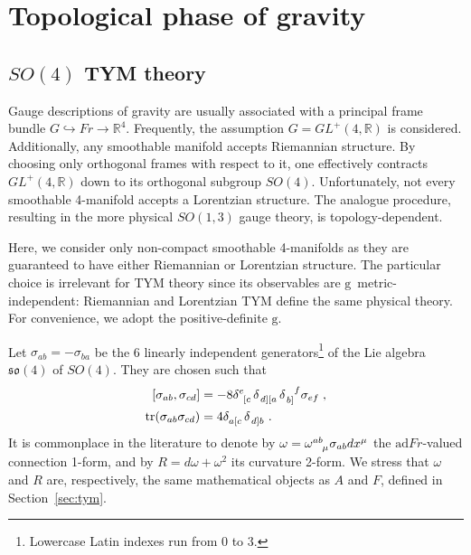\documentclass[../main.tex]{subfiles}
\begin{document}
\section{Topological phase of gravity}%
\label{sec:top_grav}

\subsection{\texorpdfstring{$SO(4)$}{SO(4)} TYM theory}%
\label{ssec:so4tym;sec:top_grav}

Gauge descriptions of gravity are usually associated with a principal frame bundle $G \hookrightarrow Fr \rightarrow \mathbb{R}^4 $. Frequently, the assumption $G = GL^{+}\left( 4, \mathbb{R} \right)$ is considered. Additionally, any smoothable manifold accepts Riemannian structure. By choosing only orthogonal frames with respect to it, one effectively contracts $GL^{+} \left( 4,\mathbb{R} \right)$ down to its orthogonal subgroup $SO \left( 4 \right)$. Unfortunately, not every smoothable 4-manifold accepts a Lorentzian structure. The analogue procedure, resulting in the more physical $SO \left( 1,3 \right)$ gauge theory, is topology-dependent.

Here, we consider only non-compact smoothable 4-manifolds as they are guaranteed to have either Riemannian or Lorentzian structure. The particular choice is irrelevant for TYM theory since its observables are $ \mathrm{g} $~metric-independent: Riemannian and Lorentzian TYM define the same physical theory. For convenience, we adopt the positive-definite $ \mathrm{g} $.

Let $\sigma_{ab}=-\sigma_{ba}$ be the 6 linearly independent generators\footnote{Lowercase Latin indexes run from 0 to 3.} of the Lie algebra $\mathfrak{so}\left( 4 \right)$ of $SO(4)$. They are chosen such that
\begin{subequations}%
  \label{eq:so4algebra}
  \begin{align}
    \left[ \sigma_{ab}, \sigma_{cd} \right] & =-8\tensor{\delta}{^{e}_{\left[ c \right.}}\tensor{\delta}{_{\left. d \right] \left[ a \right.}} \tensor{\delta}{_{\left. b \right]}^f} \sigma_{ef} \;, \\ %
    \tr (\sigma_{ab}\sigma_{cd})            & = 4 \tensor{\delta}{_{ a \left[ c \right. }} \tensor{\delta}{_{ \left. d \right] b }} \;.                                                               %
  \end{align}
\end{subequations}
It is commonplace in the literature to denote by $\omega=\tensor{\omega}{^{ab}_\mu} \sigma_{ab}dx^\mu$ the $\mathrm{ad} Fr $-valued connection 1-form, and by $R=d \omega + \omega^2$ its curvature 2-form. We stress that $ \omega $ and $ R $ are, respectively, the same mathematical objects as $A$ and $F$, defined in Section~\ref{sec:tym}.
\end{document}
